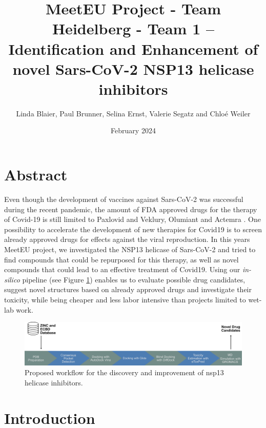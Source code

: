 \documentclass[11pt, letterpaper, titlepage]{article}
\title{MeetEU Project - Team Heidelberg - Team 1 -- \\ Identification and Enhancement of novel Sars-CoV-2 NSP13 helicase inhibitors}
\author{Linda Blaier, Paul Brunner, Selina Ernst, Valerie Segatz and Chlo\'{e} Weiler}
\date{February 2024}
\renewcommand{\cite}{\parencite}
\begin{document}
\maketitle

\ihead{\headmark}
\cfoot{\pagemark}   %

\section{Abstract}
Even though the development of vaccines against Sars-CoV-2 was successful during the recent pandemic, the amount of FDA approved drugs for the therapy of Covid-19 is still limited to Paxlovid and Veklury, Olumiant and Actemra \cite{FDACOVID}. One possibility to accelerate the development of new therapies for Covid19 is to screen already approved drugs for effects against the viral reproduction. In this years MeetEU project, we investigated the NSP13 helicase of Sars-CoV-2 and tried to find compounds that could be repurposed for this therapy, as well as novel compounds that could lead to an effective treatment of Covid19. Using our \textit{in-silico} pipeline (see Figure \ref{workflow}) enables us to evaluate possible drug candidates, suggest novel structures based on already approved drugs and investigate their toxicity, while being cheaper and less labor intensive than projects limited to wet-lab work. 

\begin{figure}[h]
  \centering
  \includegraphics[width=\textwidth]{Workflow_MeetEU.pdf}
  \caption{Proposed workflow for the discovery and improvement of nsp13 helicase inhibitors.}
  \label{workflow}
\end{figure}

\FloatBarrier


\section{Introduction}
\end{document}
